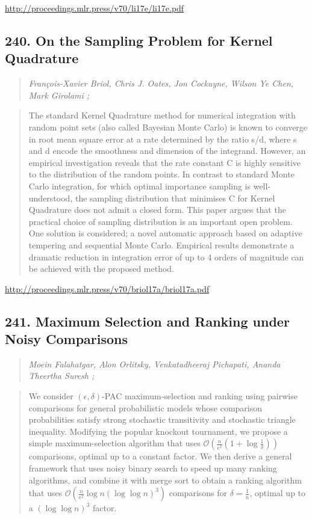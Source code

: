 \documentclass{article}
\begin{document}
\href{http://proceedings.mlr.press/v70/li17e/li17e.pdf}{http://proceedings.mlr.press/v70/li17e/li17e.pdf}

\subsection{240. On the Sampling Problem for Kernel Quadrature}

\begin{quote}
\footnotesize{\textit{François-Xavier Briol, Chris J. Oates, Jon Cockayne, Wilson Ye Chen, Mark Girolami ;}}
\end{quote}

\begin{quote}
    The standard Kernel Quadrature method for numerical integration with random point sets (also called Bayesian Monte Carlo) is known to converge in root mean square error at a rate determined by the ratio s/d, where s and d encode the smoothness and dimension of the integrand. However, an empirical investigation reveals that the rate constant C is highly sensitive to the distribution of the random points. In contrast to standard Monte Carlo integration, for which optimal importance sampling is well-understood, the sampling distribution that minimises C for Kernel Quadrature does not admit a closed form. This paper argues that the practical choice of sampling distribution is an important open problem. One solution is considered; a novel automatic approach based on adaptive tempering and sequential Monte Carlo. Empirical results demonstrate a dramatic reduction in integration error of up to 4 orders of magnitude can be achieved with the proposed method.  \end{quote}

\href{http://proceedings.mlr.press/v70/briol17a/briol17a.pdf}{http://proceedings.mlr.press/v70/briol17a/briol17a.pdf}

\subsection{241. Maximum Selection and Ranking under Noisy Comparisons}

\begin{quote}
\footnotesize{\textit{Moein Falahatgar, Alon Orlitsky, Venkatadheeraj Pichapati, Ananda Theertha Suresh ;}}
\end{quote}

\begin{quote}
    We consider $(\epsilon,\delta)$-PAC maximum-selection and ranking using pairwise comparisons for general probabilistic models whose comparison probabilities satisfy strong stochastic transitivity and stochastic triangle inequality. Modifying the popular knockout tournament, we propose a simple maximum-selection algorithm that uses $\mathcal{O}\left(\frac{n}{\epsilon^2} \left(1+\log \frac1{\delta}\right)\right)$ comparisons, optimal up to a constant factor. We then derive a general framework that uses noisy binary search to speed up many ranking algorithms, and combine it with merge sort to obtain a ranking algorithm that uses $\mathcal{O}\left(\frac n{\epsilon^2}\log n(\log \log n)^3\right)$ comparisons for $\delta=\frac1n$, optimal up to a $(\log \log n)^3$ factor.  \end{quote}
\end{document}

